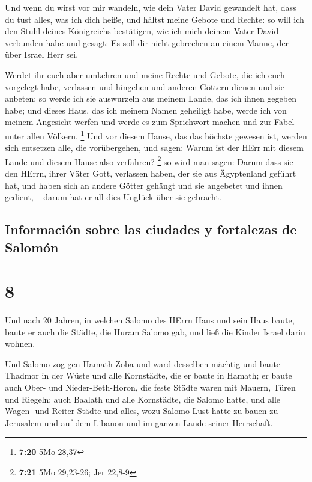  Und wenn du wirst vor mir wandeln, wie dein Vater David
gewandelt hat, dass du tust alles, was ich dich heiße, und hältst meine
Gebote und Rechte:  so will ich den Stuhl deines
Königreichs bestätigen, wie ich mich deinem Vater David verbunden habe
und gesagt: Es soll dir nicht gebrechen an einem Manne, der über Israel
Herr sei.

 Werdet ihr euch aber umkehren und meine Rechte und
Gebote, die ich euch vorgelegt habe, verlassen und hingehen und anderen
Göttern dienen und sie anbeten:  so werde ich sie
auswurzeln aus meinem Lande, das ich ihnen gegeben habe; und dieses
Haus, das ich meinem Namen geheiligt habe, werde ich von meinem
Angesicht werfen und werde es zum Sprichwort machen und zur Fabel unter
allen Völkern. \footnote{\textbf{7:20} 5Mo 28,37}  Und
vor diesem Hause, das das höchste gewesen ist, werden sich entsetzen
alle, die vorübergehen, und sagen: Warum ist der HErr mit diesem Lande
und diesem Hause also verfahren? \footnote{\textbf{7:21} 5Mo 29,23-26;
  Jer 22,8-9}  so wird man sagen: Darum dass sie den
HErrn, ihrer Väter Gott, verlassen haben, der sie aus Ägyptenland
geführt hat, und haben sich an andere Götter gehängt und sie angebetet
und ihnen gedient, -- darum hat er all dies Unglück über sie gebracht.

\hypertarget{informaciuxf3n-sobre-las-ciudades-y-fortalezas-de-salomuxf3n}{%
\subsection{Información sobre las ciudades y fortalezas de
Salomón}\label{informaciuxf3n-sobre-las-ciudades-y-fortalezas-de-salomuxf3n}}

\hypertarget{section-7}{%
\section{8}\label{section-7}}

 Und nach 20 Jahren, in welchen Salomo des HErrn Haus und
sein Haus baute,  baute er auch die Städte, die Huram
Salomo gab, und ließ die Kinder Israel darin wohnen.

 Und Salomo zog gen Hamath-Zoba und ward desselben mächtig
 und baute Thadmor in der Wüste und alle Kornstädte, die
er baute in Hamath;  er baute auch Ober- und
Nieder-Beth-Horon, die feste Städte waren mit Mauern, Türen und Riegeln;
 auch Baalath und alle Kornstädte, die Salomo hatte, und
alle Wagen- und Reiter-Städte und alles, wozu Salomo Lust hatte zu bauen
zu Jerusalem und auf dem Libanon und im ganzen Lande seiner Herrschaft.

